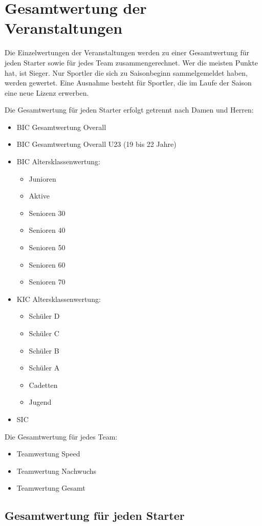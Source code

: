 \section{Gesamtwertung der Veranstaltungen}
Die Einzelwertungen der Veranstaltungen werden zu einer Gesamtwertung für jeden Starter sowie für jedes Team zusammengerechnet. Wer die meisten Punkte hat, ist Sieger. Nur Sportler die sich zu Saisonbeginn sammelgemeldet haben, werden gewertet. Eine Ausnahme besteht für Sportler, die im Laufe der Saison eine neue Lizenz erwerben.

Die Gesamtwertung für jeden Starter erfolgt getrennt nach Damen und Herren:
\begin{itemize}
	\item BIC Gesamtwertung Overall
	\item BIC Gesamtwertung Overall U23 (19 bis 22 Jahre)
	\item BIC Altersklassenwertung:
	\begin{itemize}
		\item Junioren
		\item Aktive
		\item Senioren 30
		\item Senioren 40
		\item Senioren 50
		\item Senioren 60
		\item Senioren 70
	\end{itemize}
	\item KIC Altersklassenwertung:
	\begin{itemize}
		\item Schüler D
		\item Schüler C
		\item Schüler B
		\item Schüler A
		\item Cadetten
		\item Jugend
	\end{itemize}
	\item SIC
\end{itemize}

Die Gesamtwertung für jedes Team:
\begin{itemize}
	\item Teamwertung Speed
	\item Teamwertung Nachwuchs
	\item Teamwertung Gesamt
\end{itemize}

\subsection{Gesamtwertung für jeden Starter}


